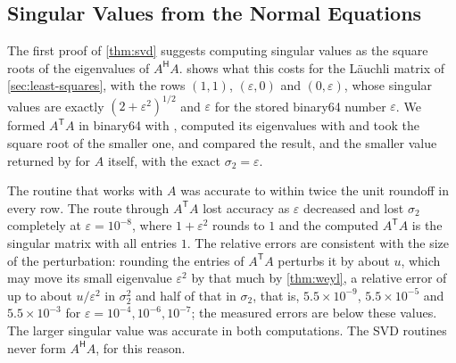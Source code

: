 \subsection{Singular Values from the Normal Equations}

The first proof of \cref{thm:svd} suggests computing singular values as the square roots of the eigenvalues of $A^{\mathsf H}A$.  shows what this costs for the L\"auchli matrix of \cref{sec:least-squares}, with the rows $(1,1)$, $(\varepsilon,0)$ and $(0,\varepsilon)$, whose singular values are exactly $(2+\varepsilon^2)^{1/2}$ and $\varepsilon$ for the stored binary64 number $\varepsilon$. We formed $A^{\mathsf T}A$ in binary64 with , computed its eigenvalues with  and took the square root of the smaller one, and compared the result, and the smaller value returned by  for $A$ itself, with the exact $\sigma_2=\varepsilon$.

\begin{table}
\end{table}

The routine that works with $A$ was accurate to within twice the unit roundoff in every row. The route through $A^{\mathsf T}A$ lost accuracy as $\varepsilon$ decreased and lost $\sigma_2$ completely at $\varepsilon=10^{-8}$, where $1+\varepsilon^2$ rounds to $1$ and the computed $A^{\mathsf T}A$ is the singular matrix with all entries $1$. The relative errors are consistent with the size of the perturbation: rounding the entries of $A^{\mathsf T}A$ perturbs it by about $u$, which may move its small eigenvalue $\varepsilon^2$ by that much by \cref{thm:weyl}, a relative error of up to about $u/\varepsilon^2$ in $\sigma_2^2$ and half of that in $\sigma_2$, that is, $5.5\times10^{-9}$, $5.5\times10^{-5}$ and $5.5\times10^{-3}$ for $\varepsilon=10^{-4},10^{-6},10^{-7}$; the measured errors are below these values. The larger singular value was accurate in both computations. The SVD routines never form $A^{\mathsf H}A$, for this reason.

